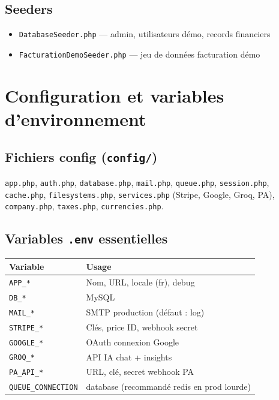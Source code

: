 \documentclass[11pt,a4paper]{report}
\newcommand{\filepath}[1]{\texttt{\small #1}}
\begin{document}
\section{Seeders}

\begin{itemize}[leftmargin=1.5em]
    \item \filepath{DatabaseSeeder.php} — admin, utilisateurs démo, records financiers
    \item \filepath{FacturationDemoSeeder.php} — jeu de données facturation démo
\end{itemize}

\chapter{Configuration et variables d'environnement}

\section{Fichiers config (\filepath{config/})}

\texttt{app.php}, \texttt{auth.php}, \texttt{database.php}, \texttt{mail.php}, \texttt{queue.php}, \texttt{session.php}, \texttt{cache.php}, \texttt{filesystems.php}, \texttt{services.php} (Stripe, Google, Groq, PA), \texttt{company.php}, \texttt{taxes.php}, \texttt{currencies.php}.

\section{Variables \filepath{.env} essentielles}

\begin{longtable}{@{}p{4.5cm}p{8.8cm}@{}}
\toprule
\textbf{Variable} & \textbf{Usage} \\
\midrule
\endhead
\texttt{APP\_*} & Nom, URL, locale (fr), debug \\
\texttt{DB\_*} & MySQL \\
\texttt{MAIL\_*} & SMTP production (défaut : log) \\
\texttt{STRIPE\_*} & Clés, price ID, webhook secret \\
\texttt{GOOGLE\_*} & OAuth connexion Google \\
\texttt{GROQ\_*} & API IA chat + insights \\
\texttt{PA\_API\_*} & URL, clé, secret webhook PA \\
\texttt{QUEUE\_CONNECTION} & database (recommandé redis en prod lourde) \\
\bottomrule
\end{longtable}
\end{document}
